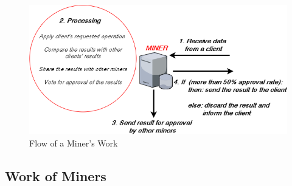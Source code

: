 \documentclass{article}
\begin{document}
\begin{figure}[h]
  \includegraphics[width=0.5\linewidth]{figures/miner_work_diagram.png}
  \caption{Flow of a Miner's Work}
  \label{fig:miner_work_flow}
\end{figure}


\subsection{Work of Miners}\label{ssec:work_of_miners}



\newpage


\end{document}
